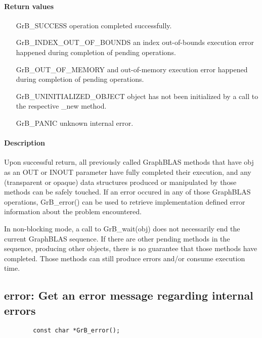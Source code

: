 \paragraph{Return values}
\begin{itemize}[leftmargin=2.3in]
	\item[{\sf GrB\_SUCCESS}]			operation completed successfully.
	\item[{\sf GrB\_INDEX\_OUT\_OF\_BOUNDS}]	an index out-of-bounds execution error happened during completion of pending operations.
	\item[{\sf GrB\_OUT\_OF\_MEMORY}]		and out-of-memory execution error happened during completion of pending operations.
	\item[{\sf GrB\_UNINITIALIZED\_OBJECT}]		object has not been initialized by a call to the respective {\sf *\_new} method.
	\item[{\sf GrB\_PANIC}]				unknown internal error.
\end{itemize}

\paragraph{Description}

Upon successful return, all previously called GraphBLAS methods that
have {\sf obj} as an {\sf OUT} or {\sf INOUT} parameter have fully
completed their execution, and any (transparent or opaque) data structures
produced or manipulated by those methods can be safely touched.  If an
error occured in any of those GraphBLAS operations, {\sf GrB\_error()}
can be used to retrieve implementation defined error information about
the problem encountered.

In non-blocking mode, a call to {\sf GrB\_wait(obj)} does not necessarily
end the current GraphBLAS sequence. If there are other pending methods
in the sequence, producing other objects, there is no guarantee that
those methods have completed. Those methods can still produce errors
and/or consume execution time.

\subsection{{\sf error}: Get an error message regarding internal errors}

\begin{verbatim}
        const char *GrB_error();
\end{verbatim}

